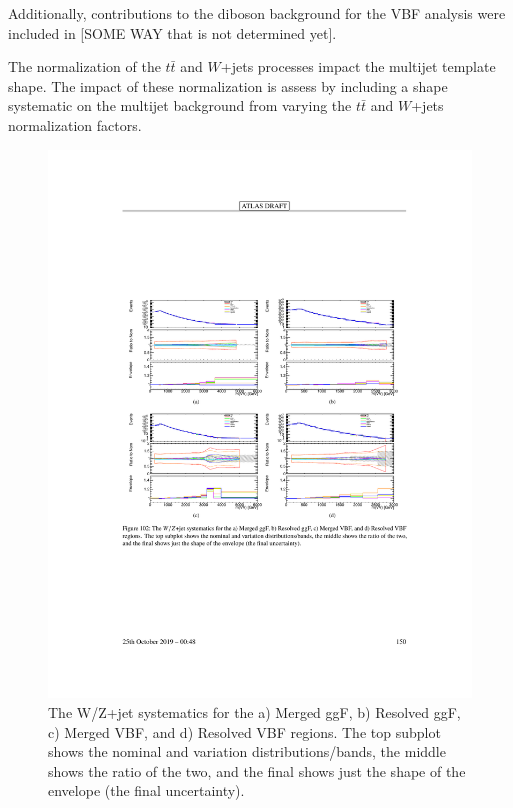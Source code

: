 Additionally, contributions to the diboson background for the VBF analysis were included in [SOME WAY that is not determined yet]. 

The normalization of the $t\bar{t}$ and $W$+jets processes impact the multijet template shape. The impact of these normalization is assess by including a shape systematic on the multijet background from varying the $t\bar{t}$ and $W$+jets normalization factors. 



\begin{figure}[h!]
  \centering
  \includegraphics[width=\hsize]{figures/Analysis/modelingsysts/w_syst.pdf}
      \caption{The W/Z+jet systematics for the a) Merged ggF, b) Resolved ggF, c) Merged VBF, and d) Resolved VBF regions. The top subplot shows the nominal and variation distributions/bands, the middle shows the ratio of the two, and the final shows just the shape of the envelope (the final uncertainty).} 
  \label{fig:w_systs}
\end{figure} 
\FloatBarrier


